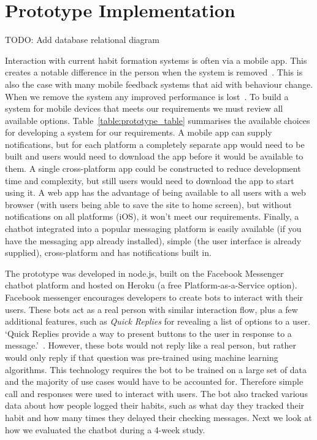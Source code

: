 
\section{Prototype Implementation}

TODO: Add database relational diagram

Interaction with current habit formation systems is often via a mobile app. This creates a notable difference in the person when the system is removed~\cite{article_my_phone_is_part_of_my_soul}.
This is also the case with many mobile feedback systems that aid with behaviour change.
When we remove the system any improved performance is lost~\cite{article_dont_kick_habit, article_realtime_feedback_improving_medication_taking}. To build a system for mobile devices that meets our requirements we must review all available options.\newline
\newline
Table~\ref{table:prototype_table} summarises the available choices for developing a system for our requirements. A mobile app can supply notifications, but for each platform a completely separate app would need to be built and users would need to download the app before it would be available to them.\newline
A single cross-platform app could be constructed to reduce development time and complexity, but still users would need to download the app to start using it.\newline
A web app has the advantage of being available to all users with a web browser (with users being able to save the site to home screen), but without notifications on all platforms (iOS), it won't meet our requirements.\newline
Finally, a chatbot integrated into a popular messaging platform is easily available (if you have the messaging app already installed), simple (the user interface is already supplied), cross-platform and has notifications built in.


The prototype was developed in node.js, built on the Facebook Messenger chatbot platform and hosted on Heroku (a free Platform-as-a-Service option). Facebook messenger encourages developers to create bots to interact with their users. These bots act as a real person with similar interaction flow, plus a few additional features, such as \textit{Quick Replies} for revealing a list of options to a user. `Quick Replies provide a way to present buttons to the user in response to a message.'~\cite{doc_fb_quick_replies}. However, these bots would not reply like a real person, but rather would only reply if that question was pre-trained using machine learning algorithms. This technology requires the bot to be trained on a large set of data and the majority of use cases would have to be accounted for. Therefore simple call and responses were used to interact with users. The bot also tracked various data about how people logged their habits, such as what day they tracked their habit and how many times they delayed their checking messages. Next we look at how we evaluated the chatbot during a 4-week study.

